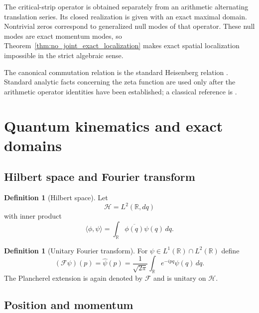 \documentclass[11pt]{amsart}
\numberwithin{equation}{section}
\theoremstyle{plain}
\theoremstyle{definition}
\newtheorem{definition}[theorem]{Definition}
\theoremstyle{remark}
\newcommand{\R}{\mathbb{R}}
\newcommand{\Hil}{\mathcal{H}}
\newcommand{\Four}{\mathcal{F}}
\begin{document}
The critical-strip operator is obtained separately from an arithmetic
alternating translation series.  Its closed realization is given with an
exact maximal domain.  Nontrivial zeros correspond to generalized null
modes of that operator.  These null modes are exact momentum modes, so
Theorem~\ref{thm:no_joint_exact_localization} makes exact spatial
localization impossible in the strict algebraic sense.

The canonical commutation relation is the standard Heisenberg relation
\cite{Heisenberg1927}.  Standard analytic facts concerning the zeta
function are used only after the arithmetic operator identities have been
established; a classical reference is \cite{Titchmarsh1986}.

\section{Quantum kinematics and exact domains}
\label{sec:quantum_kinematics}

\subsection{Hilbert space and Fourier transform}
\label{subsec:hilbert_fourier}

\begin{definition}[Hilbert space]
\label{def:hilbert_space}
Let
\begin{equation}
\Hil=L^2(\R,dq)
\label{eq:hilbert_space}
\end{equation}
with inner product
\begin{equation}
\langle \phi,\psi\rangle
=\int_{\R}\overline{\phi(q)}\psi(q)\,dq.
\label{eq:hilbert_inner_product}
\end{equation}
\end{definition}

\begin{definition}[Unitary Fourier transform]
\label{def:fourier_transform}
For $\psi\in L^1(\R)\cap L^2(\R)$ define
\begin{equation}
(\Four\psi)(p)
=\widehat\psi(p)
=\frac{1}{\sqrt{2\pi}}
\int_{\R}e^{-ipq}\psi(q)\,dq.
\label{eq:fourier_transform}
\end{equation}
The Plancherel extension is again denoted by $\Four$ and is unitary on
$\Hil$.
\end{definition}

\subsection{Position and momentum}
\label{subsec:position_momentum}
\end{document}
